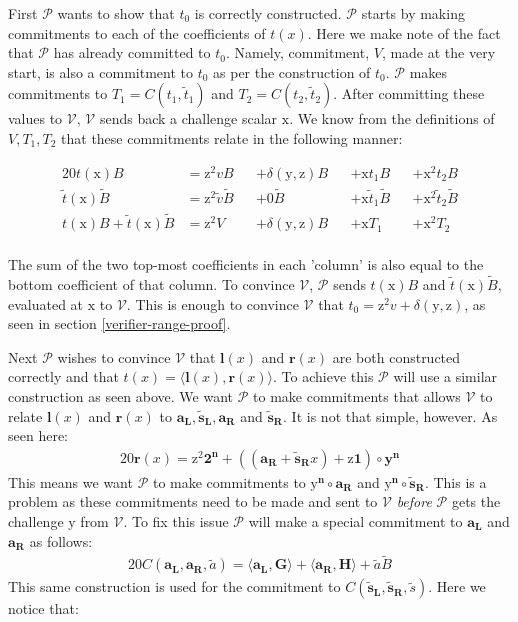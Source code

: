 \documentclass{article}
\newcommand{\eq}[1]{\begin{alignat*}{20}#1\end{alignat*}}
\renewcommand{\vec}[1]{\boldsymbol{#1}}
\newcommand{\ran}[1]{\mathrm{#1}}
\newcommand{\vecran}[1]{\mathbf{#1}}
\newcommand{\V}{\mathcal{V}}
\renewcommand{\P}{\mathcal{P}}
\newcommand{\dotp}[2]{\langle #1, #2 \rangle}
\newcommand{\opn}[1]{\operatorname{#1}}
\newcommand{\vecl}[1]{\vec{#1_{\opn{L}}}}
\newcommand{\vecr}[1]{\vec{#1_{\opn{R}}}}
\newcommand{\blind}[1]{\widetilde{#1}}
\newcommand{\bt}{\blind{t}}
\newcommand{\bv}{\blind{v}}
\newcommand{\ba}{\blind{a}}
\newcommand{\bB}{\blind{B}}
\newcommand{\bs}{\blind{s}}
\begin{document}
\newpage

First $\P$ wants to show that $t_0$ is correctly constructed. $\P$
starts by making commitments to each of the coefficients of $t(x)$. Here
we make note of the fact that $\P$ has already committed to $t_0$. Namely,
commitment, $V$, made at the very start, is also a commitment to $t_0$
as per the construction of $t_0$. $\P$ makes commitments to $T_1 =
C(t_1, \bt_1)$ and $T_2 = C(t_2, \bt_2)$. After committing these values
to $\V$, $\V$ sends back a challenge scalar $\ran{x}$. We know from
the definitions of $V, T_1, T_2$ that these commitments relate in the
following manner:

\eq{
	t(\ran{x})B                   &= \ran{z^2}vB      &&+ \delta(\ran{y},\ran{z})B &&+ \ran{x}t_1B       &&+ \ran{x^2}t_2B \\
	\bt(\ran{x})\bB               &= \ran{z^2}\bv \bB &&+ 0\bB                     &&+ \ran{x} \bt_1 \bB &&+ \ran{x^2} \bt_2 \bB\\
	t(\ran{x})B + \bt(\ran{x})\bB &= \ran{z^2}V       &&+ \delta(\ran{y},\ran{z})B &&+ \ran{x}T_1        &&+ \ran{x^2}T_2 \\
}

The sum of the two top-most coefficients in each 'column' is also
equal to the bottom coefficient of that column. To convince $\V$, $\P$
sends $t(\ran{x})B$ and $\bt(\ran{x})\bB$, evaluated at $\ran{x}$
to $\V$. This is enough to convince $\V$ that $t_0 = \ran{z^2}v +
\delta(\ran{y},\ran{z})$, as seen in section \ref{verifier-range-proof}.

Next $\P$ wishes to convince $\V$ that $\vec{l}(x)$ and
$\vec{r}(x)$ are both constructed correctly and that $t(x) =
\dotp{\vec{l}(x)}{\vec{r}(x)}$. To achieve this $\P$ will use a similar
construction as seen above. We want $\P$ to make commitments that allows
$\V$ to relate $\vec{l}(x)$ and $\vec{r}(x)$ to $\vecl{a}, \vecl{\bs},
\vecr{a}$ and $\vecr{\bs}$. It is not that simple, however. As seen here:
\eq{
	\vec{r}(x) = \ran{z^2}\vec{2^n} + ((\vecr{a} + \vecr{\bs}x) + \ran{z}\vec{1})\circ\vecran{y}^{\vec{n}}
}
This means we want $\P$ to make commitments to $\vec{\ran{y}^n}\circ
\vecr{a}$ and $\vec{\ran{y}^n}\circ\vecr{\bs}$. This is a problem as these
commitments need to be made and sent to $\V$ \textit{before} $\P$
gets the challenge $\ran{y}$ from $\V$. To fix this issue $\P$ will
make a special commitment to $\vecl{a}$ and $\vecr{a}$ as follows:
\eq{
	C(\vecl{a}, \vecr{a}, \ba) = \dotp{\vecl{a}}{\vec{G}} + \dotp{\vecr{a}}{\vec{H}} + \ba\bB
}
This same construction is used for the commitment to $C(\vecl{\bs},
\vecr{\bs}, \bs)$. Here we notice that:
\end{document}
